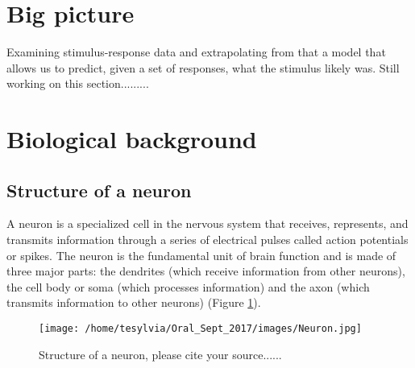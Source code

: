 
\section{Big picture}
 
Examining stimulus-response data and extrapolating from that a model
that allows us to predict, given a set of responses, what the stimulus 
likely was.  Still working on this section.........






\section{Biological background}
\subsection{Structure of a neuron}
A neuron is a specialized cell in the nervous system that receives, represents, and transmits information through a series of electrical pulses called action potentials or spikes. The neuron is the fundamental unit of brain function and is made of three major parts: the dendrites (which receive information from other neurons), the cell body or soma (which processes information) and the axon (which transmits information to other neurons) (Figure \ref{fig:Neuron}).

\begin{figure}[h]
\centering
\texttt{[image: /home/tesylvia/Oral\_Sept\_2017/images/Neuron.jpg]}
\caption{Structure of  a neuron, please cite your source......}
      \label{fig:Neuron}
\end{figure}


